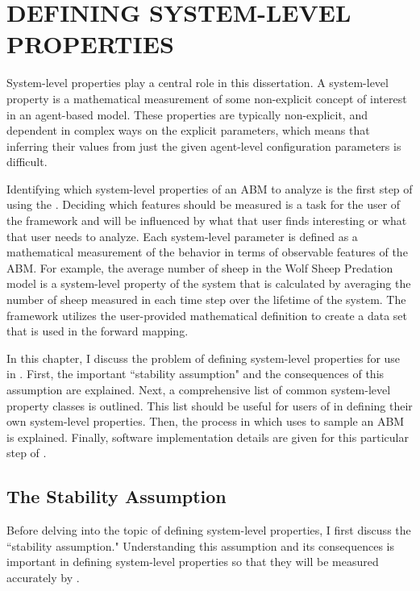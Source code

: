\chapter{DEFINING SYSTEM-LEVEL PROPERTIES}
\thispagestyle{plain}

\label{Defining}

System-level properties play a central role in this dissertation.
A system-level property is a mathematical measurement of some non-explicit concept of interest in an agent-based model.
These properties are typically non-explicit, and dependent in complex ways on the explicit parameters, which means that inferring their values from just the given agent-level configuration parameters is difficult.

Identifying which system-level properties of an ABM to analyze is the first step of using the \framework.
Deciding which features should be measured is a task for the user of the framework and will be influenced by what that user finds interesting or what that user needs to analyze.
Each system-level parameter is defined as a mathematical measurement of the behavior in terms of observable features of the ABM.
For example, the average number of sheep in the Wolf Sheep Predation model is a system-level property of the system that is calculated by averaging the number of sheep measured in each time step over the lifetime of the system.
The framework utilizes the user-provided mathematical definition to create a data set that is used in the forward mapping.

In this chapter, I discuss the problem of defining system-level properties for use in \fw.
First, the important ``stability assumption" and the consequences of this assumption are explained.
Next, a comprehensive list of common system-level property classes is outlined.
This list should be useful for users of \fw in defining their own system-level properties.
Then, the process in which \fw uses to sample an ABM is explained.
Finally, software implementation details are given for this particular step of \fw.


\section{The Stability Assumption}

Before delving into the topic of defining system-level properties, I first discuss the ``stability assumption."
Understanding this assumption and its consequences is important in defining system-level properties so that they will be measured accurately by \fw.

